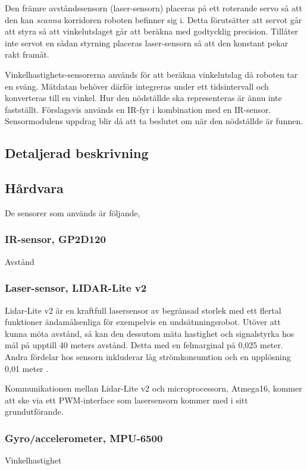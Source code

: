\documentclass[11pt]{article}
\begin{document}
\begin{flushleft}
Den främre avståndssensorn (laser-sensorn) placeras på ett roterande servo så att den kan \emph{scanna} korridoren roboten befinner sig i. Detta förutsätter att servot går att styra så att vinkelutslaget går att beräkna med godtycklig precision. Tillåter inte servot en sådan styrning placeras laser-sensorn så att den konstant pekar rakt framåt.

Vinkelhastighets-sensorerna används för att beräkna vinkelutslag då roboten tar en sväng. Mätdatan behöver därför integreras under ett tidsintervall och konverteras till en vinkel. Hur den nödställde ska representeras är ännu inte fastställt. Förslagsvis används en IR-fyr i kombination med en IR-sensor. Sensormodulens uppdrag blir då att ta beslutet om när den nödställde är funnen.

\subsection{Detaljerad beskrivning}
\lipsum

\subsection{Hårdvara}
De sensorer som används är följande,



\subsubsection{IR-sensor, GP2D120}
	\item[Avstånd] \hfill \\

\subsubsection{Laser-sensor, LIDAR-Lite v2}
Lidar-Lite v2 är en kraftfull lasersensor av begränsad storlek med ett flertal funktioner ändamålsenliga för exempelvis en undsätnningsrobot. Utöver att kunna möta avstånd, så kan den dessutom mäta hastighet och signalstyrka hos mål på upptill 40 meters avstånd. Detta med en felmarginal på 0,025 meter. Andra fördelar hos sensorn inkluderar låg strömkonsumtion och en upplösning 0,01 meter \cite{7131685}.

Kommunikationen mellan Lidar-Lite v2 och microprocessorn, Atmega16, kommer att ske via ett PWM-interface som lasersensorn kommer med i sitt grundutförande. 


\subsubsection{Gyro/accelerometer, MPU-6500}
\item[Vinkelhastighet] \hfill \\
 

\end{flushleft}
\end{document}
